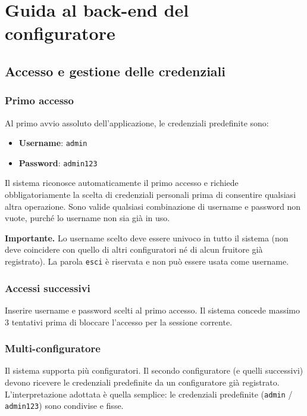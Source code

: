 \documentclass[12pt,a4paper,oneside]{report}
\newcommand{\cmd}[1]{\texttt{\small#1}}
\begin{document}
\chapter{Guida al back-end del configuratore}
\label{cap:configuratore}

\section{Accesso e gestione delle credenziali}

\subsection{Primo accesso}
Al primo avvio assoluto dell'applicazione, le credenziali predefinite sono:
\begin{itemize}
  \item \textbf{Username}: \cmd{admin}
  \item \textbf{Password}: \cmd{admin123}
\end{itemize}
Il sistema riconosce automaticamente il primo accesso e richiede obbligatoriamente la scelta di credenziali personali prima di consentire qualsiasi altra operazione. Sono valide qualsiasi combinazione di username e password non vuote, purché lo username non sia già in uso.

\begin{avvisobox}
\textbf{Importante.} Lo username scelto deve essere univoco in tutto il sistema (non deve coincidere con quello di altri configuratori né di alcun fruitore già registrato). La parola \cmd{esci} è riservata e non può essere usata come username.
\end{avvisobox}

\subsection{Accessi successivi}
Inserire username e password scelti al primo accesso. Il sistema concede massimo 3 tentativi prima di bloccare l'accesso per la sessione corrente.

\subsection{Multi-configuratore}
Il sistema supporta più configuratori. Il secondo configuratore (e quelli successivi) devono ricevere le credenziali predefinite da un configuratore già registrato. L'interpretazione adottata è quella semplice: le credenziali predefinite (\cmd{admin} / \cmd{admin123}) sono condivise e fisse.
\end{document}
